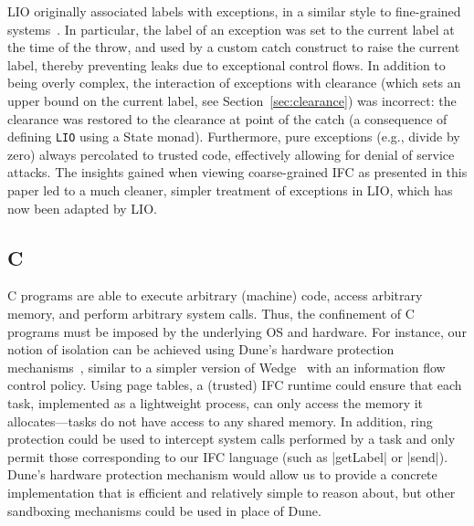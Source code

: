 %
LIO originally associated labels with exceptions, in a
similar style to fine-grained
systems~\cite{stefan:2012:arxiv-flexible, Hritcu:2013:YIB:2497621.2498098}.
%
In particular, the label of an exception was set to the current label
at the time of the throw, and used by a custom catch construct to
raise the current label, thereby preventing leaks due to exceptional
control flows.
%
In addition to being overly complex, the interaction of exceptions
with clearance (which sets an upper bound on the current label, see
Section~\ref{sec:clearance}) was incorrect: the clearance
was restored to the clearance at point of the catch (a consequence of
defining \verb|LIO| using a State monad).
%
Furthermore, pure exceptions (e.g., divide by zero) always percolated to
trusted code, effectively allowing for denial of service attacks.
%
The insights gained when viewing coarse-grained IFC as presented in this
paper led to a much cleaner, simpler treatment of exceptions in LIO,
which has now been adapted by LIO.






\subsection{C}
\label{sec:real:c}
%
C programs are able to execute arbitrary (machine) code, access
arbitrary memory, and perform arbitrary system calls.
%
Thus, the confinement of C programs must be imposed by the underlying OS
and hardware.
%
For instance, our notion of isolation can be achieved using Dune's
hardware protection mechanisms~\cite{Belay:2012:DSU:2387880.2387913},
similar to a simpler version of
Wedge~\cite{Belay:2012:DSU:2387880.2387913,
Bittau:2008:WSA:1387589.1387611} with an information flow control
policy.
%
Using page tables, a (trusted) IFC runtime could ensure that each task,
implemented as a lightweight process, can only access the memory it
allocates---tasks do not have access to any shared memory.
%
In addition, ring protection could be used to intercept system
calls performed by
a task and only permit those corresponding to our IFC language (such as
|getLabel| or |send|).
%
Dune's hardware protection mechanism would allow us to provide a concrete
implementation that is efficient and relatively simple to reason
about, but other sandboxing mechanisms could be used in place of Dune.

